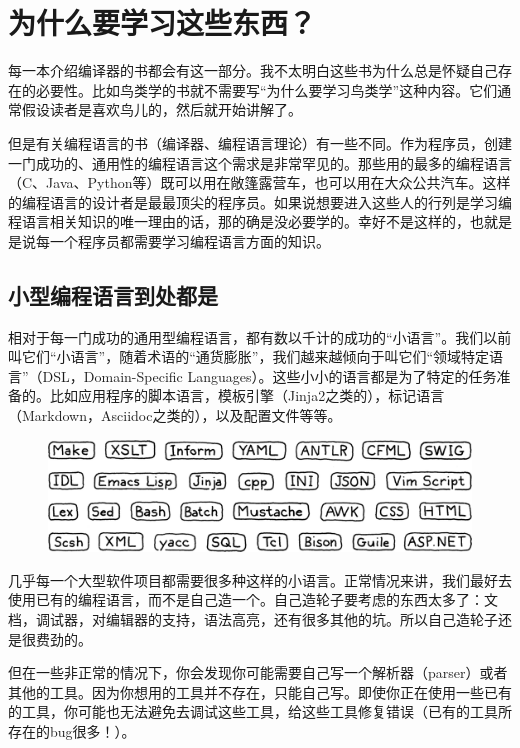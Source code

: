 \documentclass[cn,10pt,math=newtx,citestyle=gb7714-2015,bibstyle=gb7714-2015]{elegantbook}
\begin{document}
\section{为什么要学习这些东西？}

每一本介绍编译器的书都会有这一部分。我不太明白这些书为什么总是怀疑自己存在的必要性。比如鸟类学的书就不需要写“为什么要学习鸟类学”这种内容。它们通常假设读者是喜欢鸟儿的，然后就开始讲解了。

但是有关编程语言的书（编译器、编程语言理论）有一些不同。作为程序员，创建一门成功的、通用性的编程语言这个需求是非常罕见的。那些用的最多的编程语言（C、Java、Python等）既可以用在敞篷露营车，也可以用在大众公共汽车。这样的编程语言的设计者是最最顶尖的程序员。如果说想要进入这些人的行列是学习编程语言相关知识的唯一理由的话，那的确是没必要学的。幸好不是这样的，也就是是说每一个程序员都需要学习编程语言方面的知识。

\subsection{小型编程语言到处都是}

相对于每一门成功的通用型编程语言，都有数以千计的成功的“小语言”。我们以前叫它们“小语言”，随着术语的“通货膨胀”，我们越来越倾向于叫它们“领域特定语言”（DSL，Domain-Specific Languages）。这些小小的语言都是为了特定的任务准备的。比如应用程序的脚本语言，模板引擎（Jinja2之类的），标记语言（Markdown，Asciidoc之类的），以及配置文件等等。

\begin{figure}[h]
\centering
\includegraphics[width=\textwidth]{./image/introduction/little-languages.png}
\end{figure}

几乎每一个大型软件项目都需要很多种这样的小语言。正常情况来讲，我们最好去使用已有的编程语言，而不是自己造一个。自己造轮子要考虑的东西太多了：文档，调试器，对编辑器的支持，语法高亮，还有很多其他的坑。所以自己造轮子还是很费劲的。

但在一些非正常的情况下，你会发现你可能需要自己写一个解析器（parser）或者其他的工具。因为你想用的工具并不存在，只能自己写。即使你正在使用一些已有的工具，你可能也无法避免去调试这些工具，给这些工具修复错误（已有的工具所存在的bug很多！）。
\end{document}

